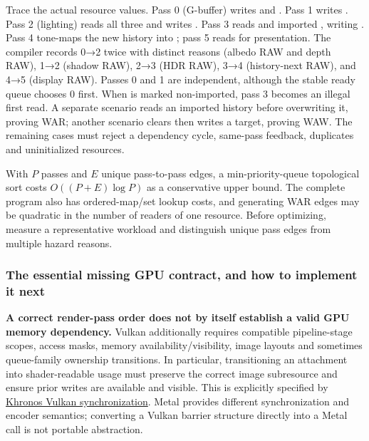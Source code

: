 Trace the actual resource values. Pass 0 (G-buffer) writes  and . Pass 1 writes . Pass 2 (lighting) reads all three and writes . Pass 3 reads  and imported , writing . Pass 4 tone-maps the new history into ; pass 5 reads  for presentation. The compiler records 0→2 twice with distinct reasons (albedo RAW and depth RAW), 1→2 (shadow RAW), 2→3 (HDR RAW), 3→4 (history-next RAW), and 4→5 (display RAW). Passes 0 and 1 are independent, although the stable ready queue chooses 0 first. When  is marked non-imported, pass 3 becomes an illegal first read. A separate scenario reads an imported history before overwriting it, proving WAR; another scenario clears then writes a target, proving WAW. The remaining cases must reject a dependency cycle, same-pass feedback, duplicates and uninitialized resources.

With \(P\) passes and \(E\) unique pass-to-pass edges, a min-priority-queue topological sort costs \(O((P+E)\log P)\) as a conservative upper bound. The complete program also has ordered-map/set lookup costs, and generating WAR edges may be quadratic in the number of readers of one resource. Before optimizing, measure a representative workload and distinguish unique pass edges from multiple hazard reasons.

\subsubsection{The essential missing GPU contract, and how to implement it next}\label{06-engine-ii-ch042-the-essential-missing-gpu-contract-and-how-to-implement-it-next}

\hypertarget{06-engine-ii-ch042-the-essential-missing-gpu-contract-and-how-to-implement-it-next}{}

\textbf{A correct render-pass order does not by itself establish a valid GPU memory dependency.} Vulkan additionally requires compatible pipeline-stage scopes, access masks, memory availability/visibility, image layouts and sometimes queue-family ownership transitions. In particular, transitioning an attachment into shader-readable usage must preserve the correct image subresource and ensure prior writes are available and visible. This is explicitly specified by \href{https://docs.vulkan.org/spec/latest/chapters/synchronization.html}{Khronos Vulkan synchronization}. Metal provides different synchronization and encoder semantics; converting a Vulkan barrier structure directly into a Metal call is not portable abstraction.

